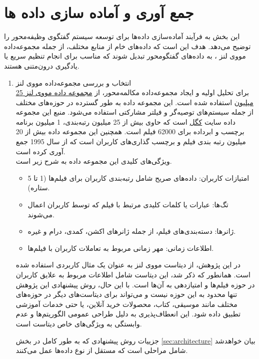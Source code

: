 \section{جمع آوری و آماده سازی داده ها}
\label{chap:dataset}
این بخش به فرآیند آماده‌سازی داده‌ها برای توسعه سیستم گفتگوی وظیفه‌محور را توضیح می‌دهد. هدف این است که داده‌های خام از منابع مختلف، از جمله مجموعه‌داده 
مووی لنز%
، به داده‌های گفتگو‌محور تبدیل شوند که مناسب برای انجام تنظیم سریع یا یادگیری درون‌متنی%
 هستند.
\begin{enumerate}
\item
انتخاب و بررسی مجموعه‌داده مووی لنز\\
برای تحلیل اولیه و ایجاد مجموعه‌داده مکالمه‌محور، از 
\href{https://www.kaggle.com/datasets/garymk/movielens-25m-dataset}{مجموعه داده مووی لنز 25 میلیون}
 استفاده شده است. این مجموعه داده به طور گسترده در حوزه‌های مختلف از جمله سیستم‌های توصیه‌گر و فیلتر مشارکتی استفاده می‌شود. منبع این مجموعه داده سایت 
\href{https://www.kaggle.com}{کگل}
 است که حاوی بیش از 25 میلیون رتبه‌بندی، 1 میلیون برنامه برچسب و ابرداده برای 62000 فیلم است. همچنین این مجموعه داده بیش از 20 میلیون رتبه بندی فیلم و برچسب گذاری‌های کاربران است که از سال 1995 جمع آوری کرده است. \\


ویژگی‌های کلیدی این مجموعه داده به شرح زیر است.
\begin{itemize}
\item
امتیازات کاربران: داده‌های صریح شامل رتبه‌بندی کاربران برای فیلم‌ها (1 تا 5 ستاره).
\item
تگ‌ها: عبارات یا کلمات کلیدی مرتبط با فیلم که توسط کاربران اعمال می‌شوند.
\item
ژانرها: دسته‌بندی‌های فیلم، از جمله ژانرهای اکشن، کمدی، درام و غیره.
\item
اطلاعات زمانی: مهر زمانی مربوط به تعاملات کاربران با فیلم‌ها.
\end{itemize}

در این پژوهش، از دیتاست مووی لنز به عنوان یک مثال کاربردی استفاده شده است. همانطور که ذکر شد، این دیتاست شامل اطلاعات مربوط به علایق کاربران در حوزه فیلم‌ها و امتیازدهی به آن‌ها است. با این حال، روش پیشنهادی این پژوهش تنها محدود به این حوزه نیست و می‌تواند برای دیتاست‌های دیگر در حوزه‌های مختلف مانند موسیقی، کتاب، محصولات خرید آنلاین، یا حتی خدمات آموزشی تطبیق داده شود. این انعطاف‌پذیری به دلیل طراحی عمومی الگوریتم‌ها و عدم وابستگی به ویژگی‌های خاص دیتاست است.
 
جزییات روش پیشنهادی که به طور کامل در بخش%
\ref{sec:architecture}
 بیان خواهدشد شامل مراحلی است که مستقل از نوع داده‌ها عمل می‌کنند.


\end{enumerate}
